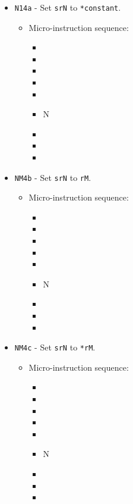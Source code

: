 \documentclass{article}
\begin{document}
\begin{itemize}
    \item \Verb|N14a| - Set \Verb|srN| to \Verb|*constant|.
    \begin{itemize}
        \item Micro-instruction sequence:
        \begin{itemize}
            \item \pkptroutinc
            \item \datatooffs
            \item \incrementpk
            \item \pkptroutinc
            \item \holddata
            \item \specialtoaddr N
            \item \writeRAMo
            \item \incrementpk
            \item \done
        \end{itemize}
    \end{itemize}
    
    \item \Verb|NM4b| - Set \Verb|srN| to \Verb|rM|.
    \begin{itemize}
        \item Micro-instruction sequence:
        \begin{itemize}
            \item \pkptroutinc
            \item \datatooffs
            \item \incrementpk
            \item \pkptroutinc
            \item \holddata
            \item \specialtoaddr N
            \item \writeRAMo
            \item \incrementpk
            \item \done
        \end{itemize}
    \end{itemize}
    
    \item \Verb|NM4c| - Set \Verb|srN| to \Verb|*rM|.
    \begin{itemize}
        \item Micro-instruction sequence:
        \begin{itemize}
            \item \pkptroutinc
            \item \datatooffs
            \item \incrementpk
            \item \pkptroutinc
            \item \holddata
            \item \specialtoaddr N
            \item \writeRAMo
            \item \incrementpk
            \item \done
        \end{itemize}
    \end{itemize}
    

\end{itemize}
\end{document}
